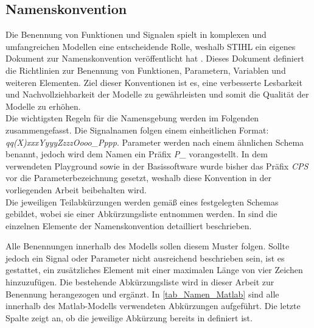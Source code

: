 \subsection{Namenskonvention}
\label{subsec_namenskonvention}
Die Benennung von Funktionen und Signalen spielt in komplexen und umfangreichen Modellen eine entscheidende Rolle, weshalb STIHL ein eigenes Dokument zur Namenskonvention veröffentlicht hat \cite{NamenRichtlinien}. Dieses Dokument definiert die Richtlinien zur Benennung von Funktionen, Parametern, Variablen und weiteren Elementen. Ziel dieser Konventionen ist es, eine verbesserte Lesbarkeit und Nachvollziehbarkeit der Modelle zu gewährleisten und somit die Qualität der Modelle zu erhöhen.\\
Die wichtigsten Regeln für die Namensgebung werden im Folgenden zusammengefasst. Die Signalnamen folgen einem einheitlichen Format: \textit{qq(X)xxxYyyyZzzzOooo\_Pppp}. Parameter werden nach einem ähnlichen Schema benannt, jedoch wird dem Namen ein Präfix \textit{P\_} vorangestellt. In dem verwendeten Playground sowie in der Basissoftware wurde bisher das Präfix \textit{CPS} vor die Parameterbezeichnung gesetzt, weshalb diese Konvention in der vorliegenden Arbeit beibehalten wird. \\
Die jeweiligen Teilabkürzungen werden gemäß eines festgelegten Schemas gebildet, wobei sie einer Abkürzungsliste entnommen werden. In  sind die einzelnen Elemente der Namenskonvention detailliert beschrieben. 

Alle Benennungen innerhalb des Modells sollen diesem Muster folgen. Sollte jedoch ein Signal oder Parameter nicht ausreichend beschrieben sein, ist es gestattet, ein zusätzliches Element mit einer maximalen Länge von vier Zeichen hinzuzufügen. Die bestehende Abkürzungsliste wird in dieser Arbeit zur Benennung herangezogen und ergänzt. In \autoref{tab_Namen_Matlab} sind alle innerhalb des Matlab-Modells verwendeten Abkürzungen aufgeführt. Die letzte Spalte zeigt an, ob die jeweilige Abkürzung bereits in \cite{NamenRichtlinien} definiert ist.

